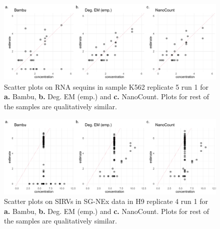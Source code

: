 \begin{figure}[H]
    \centering
    \includegraphics[width=\textwidth]{figures/sequin-scatter.png}
    \caption[Scatter plots on RNA sequins in SG-NEx data]{Scatter plots on RNA sequins in sample K562 replicate 5 run 1 for \textbf{a.} Bambu, \textbf{b.} Deg. EM (emp.) and \textbf{c.} NanoCount. Plots for rest of the samples are qualitatively similar.}
    \label{fig:sequin-scatter}
\end{figure}

\begin{figure}[H]
    \centering
    \includegraphics[width=\textwidth]{figures/lexogen-scatter.png}
    \caption[Scatter plots on SIRVs in SG-NEx data]{Scatter plots on SIRVs in SG-NEx data in H9 replicate 4 run 1 for \textbf{a.} Bambu, \textbf{b.} Deg. EM (emp.) and \textbf{c.} NanoCount. Plots for rest of the samples are qualitatively similar.}
    \label{fig:lexogen-scatter}
\end{figure}

